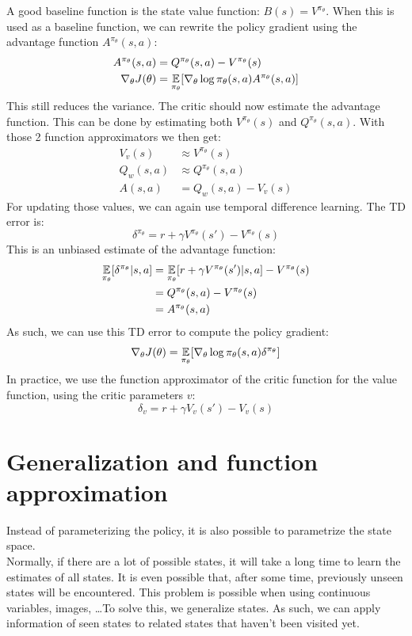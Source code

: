 A good baseline function is the state value function: $B(s) = V^{\pi_{\theta}}$. When this is used as a baseline function, we can rewrite the policy gradient using the advantage function $A^{\pi_{\theta}}(s,a)$:
\begin{align}
A^{\pi_{\theta}}(s,a) &= Q^{\pi_{\theta}}(s,a) - V^{\pi_{\theta}}(s)\\
\nabla_{\theta}J(\theta) &= \operatorname*{\mathop{{}\mathbb{E}}}_{\pi_{\theta}}[\nabla_{\theta} \log \pi_{\theta}(s,a) A^{\pi_{\theta}}(s,a)]
\end{align}
This still reduces the variance. The critic should now estimate the advantage function. This can be done by estimating both $V^{\pi_{\theta}}(s)$ and $Q^{\pi_{\theta}}(s,a)$. With those 2 function approximators we then get:
\begin{align}
V_v(s) &\approx V^{\pi_{\theta}}(s)\\
Q_w(s,a) &\approx Q^{\pi_{\theta}}(s,a)\\
A(s,a) &= Q_w(s,a) - V_v(s)
\end{align}
For updating those values, we can again use temporal difference learning. The TD error is:
\begin{equation}
\delta^{\pi_{\theta}} = r + \gamma V^{\pi_{\theta}}(s') - V^{\pi_{\theta}}(s)
\end{equation}
This is an unbiased estimate of the advantage function:
\begin{align}
\begin{split}
\operatorname*{\mathop{{}\mathbb{E}}}_{\pi_{\theta}}[\delta^{\pi_{\theta}} | s,a] &= \operatorname*{\mathop{{}\mathbb{E}}}_{\pi_{\theta}}[r + \gamma V^{\pi_{\theta}}(s') | s,a] - V^{\pi_{\theta}}(s)\\
&= Q^{\pi_{\theta}}(s,a) - V^{\pi_{\theta}}(s)\\
&= A^{\pi_{\theta}}(s,a)
\end{split}
\end{align}
As such, we can use this TD error to compute the policy gradient:
\begin{equation}
\nabla_{\theta}J(\theta) = \operatorname*{\mathop{{}\mathbb{E}}}_{\pi_{\theta}}[\nabla_{\theta} \log \pi_{\theta}(s,a) \delta^{\pi_{\theta}}]
\end{equation}
In practice, we use the function approximator of the critic function for the value function, using the critic parameters $v$:
\begin{equation}
\delta_v = r + \gamma V_v(s') - V_v(s)
\end{equation}

\section{Generalization and function approximation}
\label{sub:rl:gfa}
Instead of parameterizing the policy, it is also possible to parametrize the state space.\\
Normally, if there are a lot of possible states, it will take a long time to learn the estimates of all states.
It is even possible that, after some time, previously unseen states will be encountered.
This problem is possible when using continuous variables, images, \dots To solve this, we generalize states.
As such, we can apply information of seen states to related states that haven't been visited yet.

